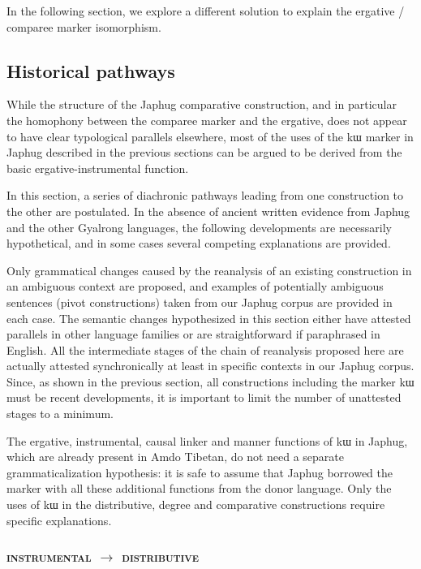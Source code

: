 \documentclass[oldfontcommands,oneside,a4paper,11pt]{article}
\newcommand{\ipa}[1]{{\phon #1}} %
\begin{document}
In the following section, we explore a different solution to explain the ergative / comparee marker isomorphism.
 
\subsection{Historical pathways}


While the structure of the Japhug comparative construction, and in particular the homophony between the comparee marker and the ergative, does not appear to have clear typological parallels elsewhere, most of the uses of the \ipa{kɯ} marker in Japhug described in the previous sections can be argued to be derived from the basic ergative-instrumental function. 

In this section, a series of diachronic pathways leading from one construction to the other are postulated. In the absence of ancient written evidence from Japhug and the other Gyalrong languages, the following developments are necessarily hypothetical, and in some cases several competing explanations are provided.

Only grammatical changes caused by the reanalysis of an existing construction in an ambiguous context are proposed, and examples of potentially ambiguous sentences (pivot constructions) taken from our Japhug corpus are provided in each case. The semantic changes hypothesized in this section  either have  attested parallels in other language families or are straightforward if paraphrased in English. All the intermediate stages of the chain of reanalysis proposed here are actually attested synchronically at least in specific contexts in our Japhug corpus. Since, as shown in the previous section, all constructions including the marker \ipa{kɯ} must be recent developments, it is important to limit the number of unattested stages to a minimum.

The ergative, instrumental, causal linker and manner functions of \ipa{kɯ} in Japhug, which are already present in Amdo Tibetan, do not need a separate grammaticalization hypothesis: it is safe to assume that Japhug borrowed the marker with all these additional functions from the donor language. Only the uses of \ipa{kɯ} in the distributive, degree and comparative constructions require specific explanations.

 \subsubsection{\textsc{instrumental} $\rightarrow$ \textsc{distributive} }
  
\end{document}

